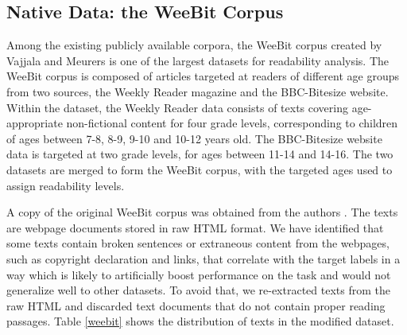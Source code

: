 \documentclass[11pt,letterpaper]{article}
\begin{document}
\subsection{Native Data: the WeeBit Corpus}
\label{nativedata}
        Among the existing publicly available corpora, the WeeBit corpus created by Vajjala and Meurers  is one of the largest datasets for readability analysis. The WeeBit corpus is composed of articles targeted at readers of different age groups from two sources, the Weekly Reader magazine and the BBC-Bitesize website. Within the dataset, the Weekly Reader data consists of texts covering age-appropriate non-fictional content for four grade levels, corresponding to children of ages between 7-8, 8-9, 9-10 and 10-12 years old. The BBC-Bitesize website data is targeted at two grade levels, for ages between 11-14 and 14-16. The two datasets are merged to form the WeeBit corpus, with the targeted ages used to assign readability levels.
		
		A copy of the original WeeBit corpus was obtained from the authors \cite{vajjala2012improving}. The texts are webpage documents stored in raw HTML format. We have identified that some texts contain broken sentences or extraneous content from the webpages, such as copyright declaration and links, that correlate with the target labels in a way which is likely to artificially boost performance on the task and would not generalize well to other datasets. To avoid that, we re-extracted texts from the raw HTML and discarded text documents that do not contain proper reading passages. Table \ref{weebit} shows the distribution of texts in the modified dataset.
		
					
	    \begin{table}[t]
			\centering
			\small
		    \caption{Number of documents in the original and modified WeeBit corpus}
			\label{weebit}

		\end{table}
		
\end{document}
